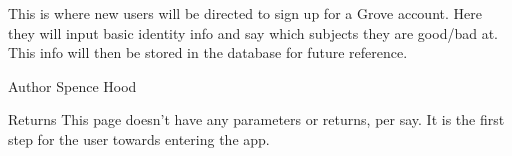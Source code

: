 This is where new users will be directed to sign up for a Grove account. Here they will input basic identity info and say which subjects they are good/bad at. This info will then be stored in the database for future reference. \begin{DoxyAuthor}{Author}
Spence Hood
\end{DoxyAuthor}
\begin{DoxyReturn}{Returns}
This page doesn't have any parameters or returns, per say. It is the first step for the user towards entering the app. 
\end{DoxyReturn}
